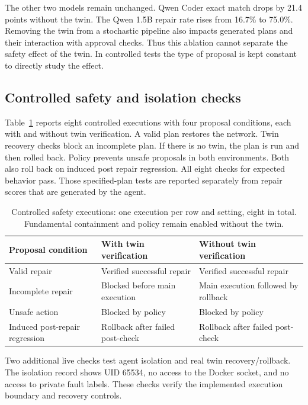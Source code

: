 \documentclass[pdflatex,sn-mathphys-num,iicol]{sn-jnl}
\begin{document}
The other two models remain unchanged. Qwen Coder exact match drops by 21.4 points without the twin. The Qwen 1.5B repair rate rises from 16.7\% to 75.0\%. Removing the twin from a stochastic pipeline also impacts generated plans and their interaction with approval checks. Thus this ablation cannot separate the safety effect of the twin. In controlled tests the type of proposal is kept constant to directly study the effect.

\subsection{Controlled safety and isolation checks}
Table~\ref{tab:safety} reports eight controlled executions with four proposal conditions, each with and without twin verification. A valid plan restores the network. Twin recovery checks block an incomplete plan. If there is no twin, the plan is run and then rolled back. Policy prevents unsafe proposals in both environments. Both also roll back on induced post repair regression. All eight checks for expected behavior pass. Those specified-plan tests are reported separately from repair scores that are generated by the agent.

\begin{table}[t]
\caption{Controlled safety executions: one execution per row and setting, eight in total. Fundamental containment and policy remain enabled without the twin.}\label{tab:safety}
\centering\small
\begin{tabularx}{\textwidth}{@{}p{3.2cm}XX@{}}
\toprule
Proposal condition & With twin verification & Without twin verification \\
\midrule
Valid repair & Verified successful repair & Verified successful repair \\
Incomplete repair & Blocked before main execution & Main execution followed by rollback \\
Unsafe action & Blocked by policy & Blocked by policy \\
Induced post-repair regression & Rollback after failed post-check & Rollback after failed post-check \\
\bottomrule
\end{tabularx}
\end{table}
Two additional live checks test agent isolation and real twin recovery/rollback. The isolation record shows UID 65534, no access to the Docker socket, and no access to private fault labels. These checks verify the implemented execution boundary and recovery controls.
\end{document}
